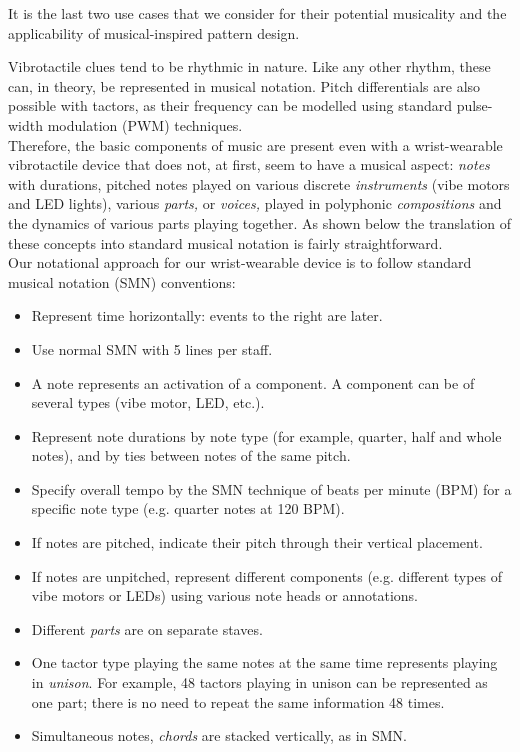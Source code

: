 \documentclass[a4paper, twocolumn]{article}
\begin{document}
It is the last two use cases that we consider for their potential musicality and the applicability of musical-inspired pattern design.

Vibrotactile clues tend to be rhythmic in nature. Like any other rhythm, these can, in theory, be represented in musical notation. Pitch differentials are also possible with tactors, as their frequency can be modelled using standard pulse-width modulation (PWM) techniques.\\

Therefore, the basic components of music are present even with a wrist-wearable vibrotactile device that does not, at first, seem to have a musical aspect: \textit{notes} with durations, pitched notes played on various discrete \textit{instruments} (vibe motors and LED lights), various \textit{parts,} or \textit{voices,} played in polyphonic \textit{compositions} and the dynamics of various parts playing together. As shown below the translation of these concepts into standard musical notation is fairly straightforward.\\

Our notational approach for our wrist-wearable device is to follow standard musical notation (SMN) conventions:

\begin{itemize}
\item Represent time horizontally: events to the right are later.
\item Use normal SMN with 5 lines per staff.
\item A note represents an activation of a component. A component can be of several types (vibe motor, LED, etc.).
\item Represent note durations by note type (for example, quarter, half and whole notes), and by ties between notes of the same pitch.
\item Specify overall tempo by the SMN technique of beats per minute (BPM) for a specific note type (e.g. quarter notes at 120 BPM).
\item If notes are pitched, indicate their pitch through their vertical placement.
\item If notes are unpitched, represent different components (e.g. different types of vibe motors or LEDs) using various note heads or annotations.
\item Different \textit{parts} are on separate staves.
\item One tactor type playing the same notes at the same time represents playing in \textit{unison}. For example, 48 tactors playing in unison can be represented as one part; there is no need to repeat the same information 48 times. 
\item Simultaneous notes, \textit{chords} are stacked vertically, as in SMN.
\end{itemize}
\end{document}
